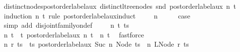 \begin{isabellebody}
\endisatagproof
{\isafoldproof}%
%
\isadelimproof
\isanewline
%
\endisadelimproof
\isanewline
{}\isamarkupfalse%
\ distinct{\isacharunderscore}{\kern0pt}nodes{\isacharunderscore}{\kern0pt}postorder{\isacharunderscore}{\kern0pt}label{\isacharunderscore}{\kern0pt}aux{\isacharcolon}{\kern0pt}\ {\isachardoublequoteopen}distinct{\isacharunderscore}{\kern0pt}ltree{\isacharunderscore}{\kern0pt}nodes\ {\isacharparenleft}{\kern0pt}snd\ {\isacharparenleft}{\kern0pt}postorder{\isacharunderscore}{\kern0pt}label{\isacharunderscore}{\kern0pt}aux\ n\ t{\isacharparenright}{\kern0pt}{\isacharparenright}{\kern0pt}{\isachardoublequoteclose}\isanewline
%
\isadelimproof
%
\endisadelimproof
%
\isatagproof
{}\isamarkupfalse%
\ {\isacharparenleft}{\kern0pt}induction\ n\ t\ rule{\isacharcolon}{\kern0pt}\ postorder{\isacharunderscore}{\kern0pt}label{\isacharunderscore}{\kern0pt}aux{\isachardot}{\kern0pt}induct{\isacharparenright}{\kern0pt}\isanewline
\ \ \isamarkupfalse%
\ {\isacharparenleft}{\kern0pt}{}\ n{\isacharparenright}{\kern0pt}\isanewline
\ \ \isamarkupfalse%
\ \isamarkupfalse%
\ {\isacharquery}{\kern0pt}case\ \isamarkupfalse%
\ {\isacharparenleft}{\kern0pt}simp\ add{\isacharcolon}{\kern0pt}\ disjoint{\isacharunderscore}{\kern0pt}family{\isacharunderscore}{\kern0pt}on{\isacharunderscore}{\kern0pt}def{\isacharparenright}{\kern0pt}\isanewline
{}\isamarkupfalse%
\isanewline
\ \ \isamarkupfalse%
\ {\isacharparenleft}{\kern0pt}{}\ n\ t\ ts{\isacharparenright}{\kern0pt}\isanewline
\ \ \isamarkupfalse%
\ n{\isacharprime}{\kern0pt}\ t{\isacharprime}{\kern0pt}\ \ t{\isacharprime}{\kern0pt}{\isacharcolon}{\kern0pt}\ {\isachardoublequoteopen}postorder{\isacharunderscore}{\kern0pt}label{\isacharunderscore}{\kern0pt}aux\ n\ t\ {\isacharequal}{\kern0pt}\ {\isacharparenleft}{\kern0pt}n{\isacharprime}{\kern0pt}{\isacharcomma}{\kern0pt}\ t{\isacharprime}{\kern0pt}{\isacharparenright}{\kern0pt}{\isachardoublequoteclose}\ \isamarkupfalse%
\ fastforce\isanewline
\ \ \isamarkupfalse%
\ n{\isacharprime}{\kern0pt}{\isacharprime}{\kern0pt}\ r\ ts{\isacharprime}{\kern0pt}\ \ ts{\isacharprime}{\kern0pt}{\isacharcolon}{\kern0pt}\ {\isachardoublequoteopen}postorder{\isacharunderscore}{\kern0pt}label{\isacharunderscore}{\kern0pt}aux\ {\isacharparenleft}{\kern0pt}Suc\ n{\isacharprime}{\kern0pt}{\isacharparenright}{\kern0pt}\ {\isacharparenleft}{\kern0pt}Node\ ts{\isacharparenright}{\kern0pt}\ {\isacharequal}{\kern0pt}\ {\isacharparenleft}{\kern0pt}n{\isacharprime}{\kern0pt}{\isacharprime}{\kern0pt}{\isacharcomma}{\kern0pt}\ LNode\ r\ ts{\isacharprime}{\kern0pt}{\isacharparenright}{\kern0pt}{\isachardoublequoteclose}\ \isamarkupfalse%

\end{isabellebody}
